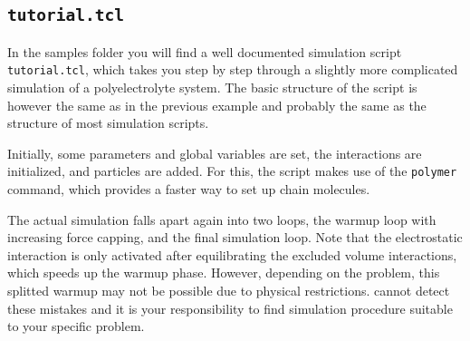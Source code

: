 \subsection{\texttt{tutorial.tcl}}

In the samples folder you will find a well documented simulation script \texttt{tutorial.tcl}, which
takes you step by step through a slightly more complicated simulation of a polyelectrolyte
system. The basic structure of the script is however the same as in the previous example and
probably the same as the structure of most \es{} simulation scripts.

Initially, some parameters and
global variables are set, the interactions are initialized, and particles are added. For this, the
script makes use of the \verb|polymer| command, which provides a faster way to set up chain
molecules.

The actual simulation falls apart again into two loops, the warmup loop with increasing force
capping, and the final simulation loop. Note that the electrostatic interaction is only activated
after equilibrating the excluded volume interactions, which speeds up the warmup phase. However,
depending on the problem, this splitted warmup may not be possible due to physical
restrictions. \es{} cannot detect these mistakes and it is your responsibility to find simulation
procedure suitable to your specific problem.

